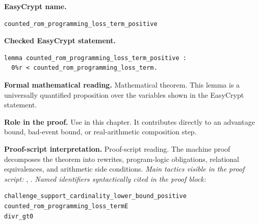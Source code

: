 \begin{formaltheorem}
\noindent\textbf{EasyCrypt name.}
\begin{lstlisting}[language=EasyCrypt,basicstyle=\ttfamily\scriptsize]
counted_rom_programming_loss_term_positive
\end{lstlisting}
\noindent\textbf{Checked EasyCrypt statement.}
\begin{lstlisting}[language=EasyCrypt,basicstyle=\ttfamily\scriptsize]
lemma counted_rom_programming_loss_term_positive :
  0%r < counted_rom_programming_loss_term.
\end{lstlisting}
\noindent\textbf{Formal mathematical reading.}
Mathematical theorem. This lemma is a universally quantified proposition over the variables shown in the EasyCrypt statement.

\noindent\textbf{Role in the proof.}
Use in this chapter. It contributes directly to an advantage bound, bad-event bound, or real-arithmetic composition step.

\noindent\textbf{Proof-script interpretation.}
Proof-script reading. The machine proof decomposes the theorem into rewrites, program-logic obligations, relational equivalences, and arithmetic side conditions.
\emph{Main tactics visible in the proof script:} , .
\emph{Named identifiers syntactically cited in the proof block:}
\begin{lstlisting}[language=EasyCrypt,basicstyle=\ttfamily\scriptsize]
challenge_support_cardinality_lower_bound_positive
counted_rom_programming_loss_termE
divr_gt0
\end{lstlisting}

\end{formaltheorem}

